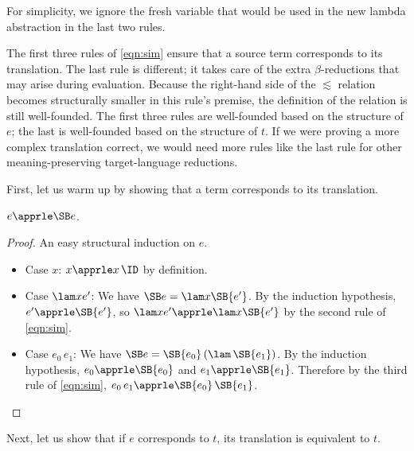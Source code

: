 For simplicity, we ignore the fresh variable that would be used in
the new lambda abstraction in the last two rules.

The first three rules of \eqref{eqn:sim} ensure that a source term corresponds to its translation.
The last rule is different; it takes care of the extra $\beta$-reductions that
may arise during evaluation. Because the right-hand side of the $\apprle$ relation becomes
structurally smaller in this rule's premise, the definition of the relation is still well-founded.
The first three rules are well-founded based on the structure of $e$; the last
is well-founded based on the structure of $t$. If we were proving a more complex translation correct,
we would need more rules like the last rule for other
meaning-preserving target-language reductions.

First, let us warm up by showing that a term corresponds to its translation.

\begin{lemma}
$e \apprle \SB e$.
\label{lem:trans}
\end{lemma}
\begin{proof}
An easy structural induction on $e$.
\begin{itemize}
\item Case $x$: $x \apprle x\,\ID$ by definition.
\item Case $\lam x e'$: We have $\SB e = \lam x \SB{e'} $.
By the induction hypothesis, $e' \apprle \SB{e'} $, so $\lam x e' \apprle \lam x \SB{e'} $
by the second rule of \eqref{eqn:sim}.
\item Case $e_0\,e_1$: We have $\SB e = \SB{e_0}\,(\lam\,{\SB{e_1}})$.
By the induction hypothesis, $e_0 \apprle \SB{e_0}$ and $e_1 \apprle \SB{e_1}$. Therefore
by the third rule of \eqref{eqn:sim}, $e_0\,e_1 \apprle \SB{e_0}\,\SB{e_1}$.
\end{itemize}
\end{proof}

Next, let us show that if $e$ corresponds to $t$, its translation is equivalent to $t$.

